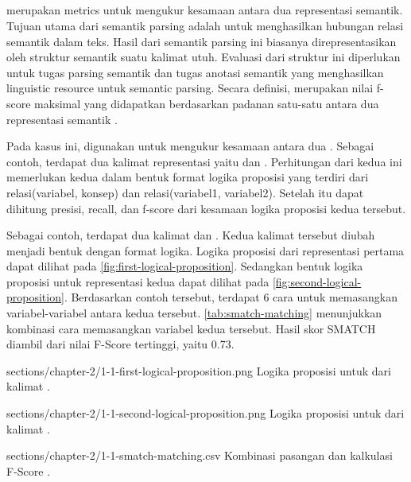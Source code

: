 \subsection{}

\SMATCH{} merupakan metrics untuk mengukur kesamaan antara dua representasi semantik.
Tujuan utama dari semantik parsing adalah untuk menghasilkan hubungan relasi semantik dalam teks.
Hasil dari semantik parsing ini biasanya direpresentasikan oleh struktur semantik suatu kalimat utuh.
Evaluasi dari struktur ini diperlukan untuk tugas parsing semantik dan tugas anotasi semantik yang menghasilkan linguistic resource untuk semantic parsing.
Secara definisi, \SMATCH{} merupakan nilai f-score maksimal yang didapatkan berdasarkan padanan satu-satu antara dua representasi semantik .

Pada kasus ini, \SMATCH{} digunakan untuk mengukur kesamaan antara dua \AMR{}.
Sebagai contoh, terdapat dua kalimat representasi \AMR{} yaitu  dan .
Perhitungan \SMATCH{} dari kedua \AMR{} ini memerlukan kedua \AMR{} dalam bentuk format logika proposisi yang terdiri dari relasi(variabel, konsep) dan relasi(variabel1, variabel2).
Setelah itu dapat dihitung presisi, recall, dan f-score dari kesamaan logika proposisi kedua \AMR{} tersebut.

Sebagai contoh, terdapat dua kalimat  dan .
Kedua kalimat tersebut diubah menjadi bentuk \AMR{} dengan format logika.
Logika proposisi dari representasi \AMR{} pertama dapat dilihat pada \cref{fig:first-logical-proposition}.
Sedangkan bentuk logika proposisi untuk representasi kedua dapat dilihat pada \cref{fig:second-logical-proposition}.
Berdasarkan contoh tersebut, terdapat 6 cara untuk memasangkan variabel-variabel antara kedua \AMR{} tersebut.
\cref{tab:smatch-matching} menunjukkan kombinasi cara memasangkan variabel kedua \AMR{} tersebut.
Hasil skor SMATCH diambil dari nilai F-Score tertinggi, yaitu 0.73.

  {sections/chapter-2/1-1-first-logical-proposition.png}
  {Logika proposisi untuk \AMR{} dari kalimat .}

  {sections/chapter-2/1-1-second-logical-proposition.png}
  {Logika proposisi untuk \AMR{} dari kalimat .}

  {sections/chapter-2/1-1-smatch-matching.csv}
  {Kombinasi pasangan \AMR{} dan kalkulasi F-Score .}

